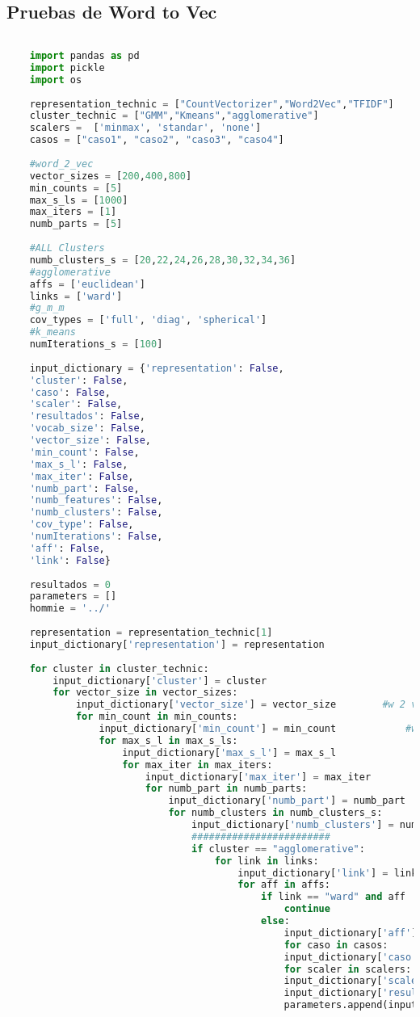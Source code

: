 \documentclass[12pt]{article}
\begin{document}
	\subsection{Pruebas de Word to Vec}
	\begin{lstlisting}[language=Python, 
	caption = Rutina de pruebas Word2Vec,
		label={lst:pruebasW2V}]
	
	import pandas as pd
	import pickle
	import os
	
	representation_technic = ["CountVectorizer","Word2Vec","TFIDF"]
	cluster_technic = ["GMM","Kmeans","agglomerative"]
	scalers =  ['minmax', 'standar', 'none']
	casos = ["caso1", "caso2", "caso3", "caso4"]
	
	#word_2_vec
	vector_sizes = [200,400,800]
	min_counts = [5]
	max_s_ls = [1000]
	max_iters = [1]
	numb_parts = [5]
	
	#ALL Clusters
	numb_clusters_s = [20,22,24,26,28,30,32,34,36]
	#agglomerative
	affs = ['euclidean']
	links = ['ward']
	#g_m_m
	cov_types = ['full', 'diag', 'spherical']
	#k_means
	numIterations_s = [100]
	
	input_dictionary = {'representation': False,
	'cluster': False,
	'caso': False,
	'scaler': False,
	'resultados': False,
	'vocab_size': False,
	'vector_size': False,
	'min_count': False,
	'max_s_l': False,
	'max_iter': False,
	'numb_part': False,
	'numb_features': False,
	'numb_clusters': False,
	'cov_type': False,
	'numIterations': False,
	'aff': False,
	'link': False}
	
	resultados = 0
	parameters = []
	hommie = '../'
	
	representation = representation_technic[1]
	input_dictionary['representation'] = representation
	
	for cluster in cluster_technic:
		input_dictionary['cluster'] = cluster    
		for vector_size in vector_sizes:
			input_dictionary['vector_size'] = vector_size        #w 2 v
			for min_count in min_counts:
				input_dictionary['min_count'] = min_count            #w 2 v
				for max_s_l in max_s_ls:
					input_dictionary['max_s_l'] = max_s_l                #w 2 v
					for max_iter in max_iters:
						input_dictionary['max_iter'] = max_iter              #w 2 v
						for numb_part in numb_parts:
							input_dictionary['numb_part'] = numb_part            #w 2 v
							for numb_clusters in numb_clusters_s:
								input_dictionary['numb_clusters'] = numb_clusters
								########################
								if cluster == "agglomerative":
									for link in links:
										input_dictionary['link'] = link
										for aff in affs:
											if link == "ward" and aff != "euclidean":
												continue
											else:
												input_dictionary['aff'] = aff    
												for caso in casos:
												input_dictionary['caso'] = caso
												for scaler in scalers:
												input_dictionary['scaler'] = scaler
												input_dictionary['resultados'] = resultados
												parameters.append(input_dictionary.copy())
												

\end{lstlisting}
\end{document}
